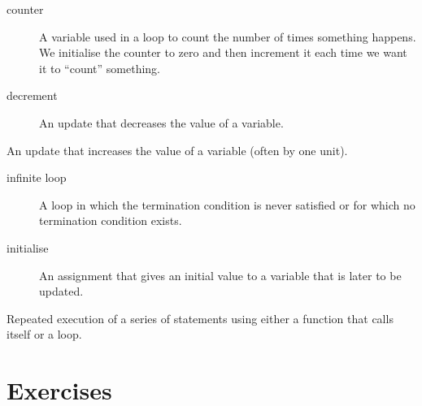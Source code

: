
\begin{description}
\item[counter]
A variable used in a loop to count the number of times something happens. We initialise the counter to zero and then increment it each time we want it to ``count'' something.
\end{description}


\begin{description}
\item[decrement]
An update that decreases the value of a variable.
\end{description}


\begin{description}
\tightlist
\item[increase]
An update that increases the value of a variable (often by one unit).
\end{description}


\begin{description}
\item[infinite loop]
A loop in which the termination condition is never satisfied or for which no termination condition exists.
\end{description}

 

\begin{description}
\item[initialise]
An assignment that gives an initial value to a variable that is later to be updated.
\end{description}


\begin{description}
\tightlist
\item[iteration]
Repeated execution of a series of statements using either a function that calls itself or a loop.
\end{description}


\section*{Exercises}\label{ejercicios}

